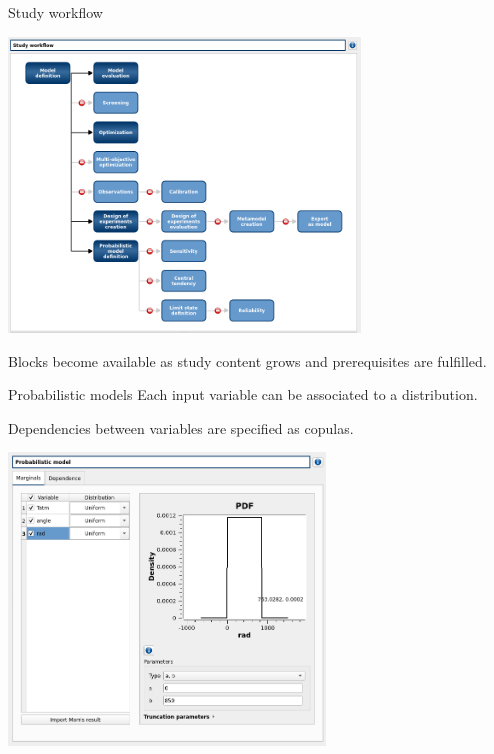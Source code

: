 \documentclass{beamer}
\begin{document}
    \begin{frame}{Study workflow}
      \centering
      
      \includegraphics[width=0.7\textwidth]{figure/StudyWorkflow.png}
      
      \small
      Blocks become available as study content grows and prerequisites are fulfilled.
      \end{frame}

\begin{frame}{Probabilistic models}
  \small
  Each input variable can be associated to a distribution.
  
  Dependencies
  between variables are specified as copulas.
  
  \centering
  
  \includegraphics[width=0.63\textwidth]{figure/overviewProbaModel.png}
  
  \end{frame}
\end{document}
